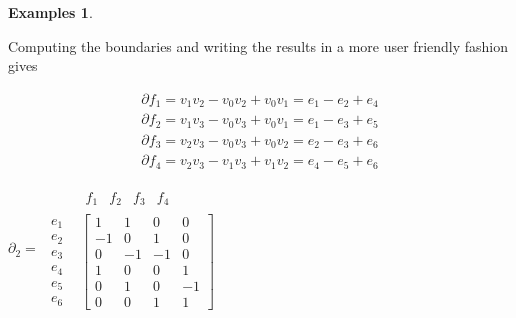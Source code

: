 \documentclass[draft]{scrartcl}
\theoremstyle{plain}
\theoremstyle{definition}
\newtheorem{examples}[theorem]{Examples}
\theoremstyle{remark}
\begin{document}
\begin{examples}
\begin{enumerate}
 Computing the boundaries and writing the results in a more user friendly fashion gives
 
 \parbox[c]{.6\linewidth}{
 \begin{align*}
 	\partial f_1=v_1v_2-v_0v_2+v_0v_1=e_1-e_2+e_4\\
 	\partial f_2=v_1v_3-v_0v_3+v_0v_1=e_1-e_3+e_5\\
 	\partial f_3=v_2v_3-v_0v_3+v_0v_2=e_2-e_3+e_6\\
 	\partial f_4=v_2v_3-v_1v_3+v_1v_2=e_4-e_5+e_6
 \end{align*}}%
\parbox[c]{.4\linewidth}{
	$\partial_2=\begin{matrix}
		 	&\begin{matrix}f_1	&f_2	&f_3	&f_4\end{matrix}\\
		\begin{matrix}
		e_1	\\
		e_2	\\
		e_3	\\
		e_4	\\
		e_5	\\
		e_6	
		\end{matrix}&
		\begin{bmatrix}
		1		&1		&0		&0\\
		-1		&0		&1		&0\\
		0		&-1		&-1		&0\\
		1		&0		&0		&1\\
		0		&1		&0		&-1\\
		0		&0		&1		&1
		\end{bmatrix}
	\end{matrix}$	
}


\end{enumerate}
\end{examples}
\end{document}
